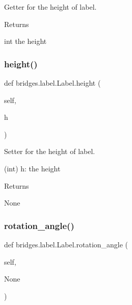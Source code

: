 Getter for the height of label. 

\begin{DoxyReturn}{Returns}


int the height 
\end{DoxyReturn}
\mbox{\label{classbridges_1_1label_1_1_label_a89643d25ae636d893538567bd249c530}} 
\subsubsection{\texorpdfstring{height()}{height()}\hspace{0.1cm}{\footnotesize\ttfamily [2/2]}}
{\footnotesize\ttfamily def bridges.\+label.\+Label.\+height (\begin{DoxyParamCaption}\item[{}]{self,  }\item[{}]{h }\end{DoxyParamCaption})}



Setter for the height of label. 

(int) h\+: the height \begin{DoxyReturn}{Returns}


None 
\end{DoxyReturn}
\mbox{\label{classbridges_1_1label_1_1_label_a7cd3059914a296d1c3aedce98a72fd3a}} 
\subsubsection{\texorpdfstring{rotation\+\_\+angle()}{rotation\_angle()}\hspace{0.1cm}{\footnotesize\ttfamily [1/2]}}
{\footnotesize\ttfamily def bridges.\+label.\+Label.\+rotation\+\_\+angle (\begin{DoxyParamCaption}\item[{}]{self,  }\item[{}]{None }\end{DoxyParamCaption})}



